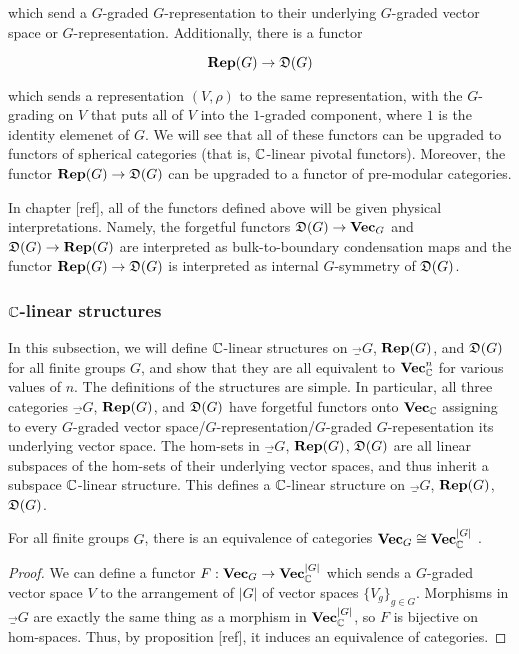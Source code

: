 which send a $G$-graded $G$-representation to their underlying $G$-graded vector space or $G$-representation. Additionally, there is a functor

$${\bf Rep}(G)\to {\mathfrak D}(G)$$

which sends a representation $(V,\rho)$ to the same representation, with the $G$-grading on $V$ that puts all of $V$ into the $1$-graded component, where $1$ is the identity elemenet of $G$. We will see that all of these functors can be upgraded to functors of spherical categories (that is, ${\mathbb C}$-linear pivotal functors). Moreover, the functor ${\bf Rep}(G)\to {\mathfrak D}(G)$ can be upgraded to a functor of pre-modular categories.

\begin{rem}
In chapter [ref], all of the functors defined above will be given physical interpretations. Namely, the forgetful functors ${\mathfrak D}(G)\to {\bf Vec}_{G}$ and ${\mathfrak D}(G)\to{\bf Rep}(G)$ are interpreted as bulk-to-boundary condensation maps and the functor ${\bf Rep}(G)\to {\mathfrak D}(G)$ is interpreted as internal $G$-symmetry of ${\mathfrak D}(G)$.
\end{rem}

\subsubsection{${\mathbb C}$-linear structures}

In this subsection, we will define ${\mathbb C}$-linear structures on $\Vec_G$, ${\bf Rep}(G)$, and ${\mathfrak D}(G)$ for all finite groups $G$, and show that they are all equivalent to ${\bf Vec}_{{\mathbb C}}^n$ for various values of $n$. The definitions of the structures are simple. In particular, all three categories $\Vec_G$, ${\bf Rep}(G)$, and ${\mathfrak D}(G)$ have forgetful functors onto ${\bf Vec}_{\mathbb C}$ assigning to every $G$-graded vector space/$G$-representation/$G$-graded $G$-repesentation its underlying vector space. The hom-sets in $\Vec_G$, ${\bf Rep}(G)$, ${\mathfrak D}(G)$ are all linear subspaces of the hom-sets of their underlying vector spaces, and thus inherit a subspace ${\mathbb C}$-linear structure. This defines a ${\mathbb C}$-linear structure on $\Vec_G$, ${\bf Rep}(G)$, ${\mathfrak D}(G)$.

\begin{prop} For all finite groups $G$, there is an equivalence of categories ${\bf Vec}_G\cong {\bf Vec}_{{\mathbb C}}^{|G|}$ .
\end{prop}
\begin{proof} We can define a functor $F:{\bf Vec}_G\to {\bf Vec}_{{\mathbb C}}^{|G|}$ which sends a $G$-graded vector space $V$ to the arrangement of $|G|$ of vector spaces $\{V_g\}_{g\in G}$. Morphisms in $\Vec_G$ are exactly the same thing as a morphism in ${\bf Vec}_{{\mathbb C}}^{|G|}$, so $F$ is bijective on hom-spaces. Thus, by proposition [ref], it induces an equivalence of categories.
\end{proof}

